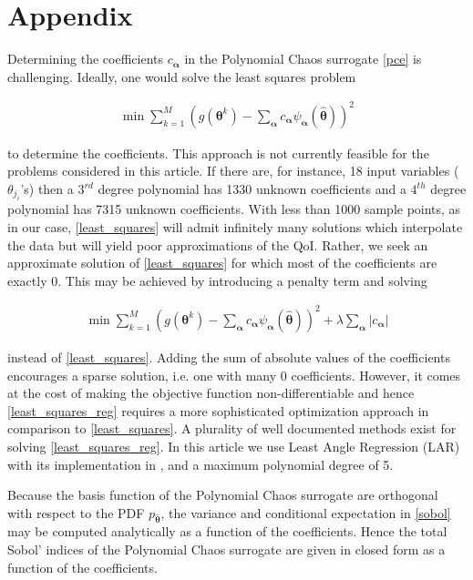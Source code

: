 \section*{Appendix}

Determining the coefficients $c_{\boldsymbol{\alpha}}$ in the Polynomial Chaos surrogate \eqref{pce} is challenging. Ideally, one would solve the least squares problem
\begin{ceqn}
\begin{eqnarray}
\label{least_squares}
\min \sum\limits_{k=1}^M \left(g(\boldsymbol{\theta}^k)-\sum_{\boldsymbol{\alpha}} c_{\boldsymbol{\alpha}} \psi_{\boldsymbol{\alpha}}(\hat{\boldsymbol{\theta}}) \right)^2 \tag{A.1}
\end{eqnarray}
\end{ceqn}
to determine the coefficients. This approach is not currently feasible for the problems considered in this article. If there are, for instance, 18 input variables ($\theta_{j_i}$'s) then a $3^{rd}$ degree polynomial has 1330 unknown coefficients and a $4^{th}$ degree polynomial has 7315 unknown coefficients. With less than 1000 sample points, as in our case, \eqref{least_squares} will admit infinitely many solutions which interpolate the data but will yield poor approximations of the QoI. Rather, we seek an approximate solution of \eqref{least_squares} for which most of the coefficients are exactly 0. This may be achieved by introducing a penalty term and solving
\begin{ceqn}
\begin{eqnarray}
\label{least_squares_reg}
\min \sum\limits_{k=1}^M \left(g(\boldsymbol{\theta}^k)-\sum_{\boldsymbol{\alpha}} c_{\boldsymbol{\alpha}} \psi_{\boldsymbol{\alpha}}(\hat{\boldsymbol{\theta}}) \right)^2 + \lambda \sum_{\boldsymbol{\alpha}} \vert c_{\boldsymbol{\alpha}} \vert \tag{A.2}
\end{eqnarray}
\end{ceqn}
instead of \eqref{least_squares}. Adding the sum of absolute values of the coefficients encourages a sparse solution, i.e. one with many 0 coefficients. However, it comes at the cost of making the objective function non-differentiable and hence \eqref{least_squares_reg} requires a more sophisticated optimization approach in comparison to \eqref{least_squares}. A plurality of well documented methods exist for solving \eqref{least_squares_reg}. In this article we use Least Angle Regression (LAR) \cite{lar} with its implementation in \cite{uqlab}, and a maximum polynomial degree of 5.

Because the basis function of the Polynomial Chaos surrogate are orthogonal with respect to the PDF $p_{\hat{\boldsymbol{\theta}}}$, the variance and conditional expectation in \eqref{sobol} may be computed analytically as a function of the coefficients. Hence the total Sobol' indices of the Polynomial Chaos surrogate are given in closed form as a function of the coefficients. 
